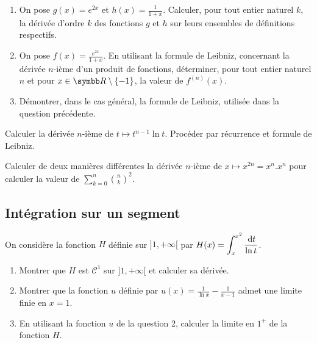 \begin{exercice}
\begin{enumerate}
    \item On pose $g(x)=e^{2x}$ et $h(x)=\frac{1}{1+x}$.
        Calculer, pour tout entier naturel $k$, la dérivée d'ordre $k$ des fonctions $g$ et $h$ sur leurs ensembles de définitions respectifs.
    \item On pose $f(x)=\frac{e^{2x}}{1+x}$.
        En utilisant la formule de Leibniz, concernant la dérivée $n$-ième d'un produit de fonctions, 
        déterminer, pour tout entier naturel $n$ et pour $x\in\R\setminus\{-1\}$, la valeur de $f^{(n)}(x)$.
    \item Démontrer, dans le cas général, la formule de Leibniz, utilisée dans la question précédente.
\end{enumerate}
\end{exercice}

\begin{exercice}
    Calculer la dérivée $n$-ième de $t \mapsto t^{n-1} \ln t$.
    Procéder par récurrence et formule de Leibniz.
\end{exercice}

\begin{exercice}
    Calculer de deux manières différentes la dérivée $n$-ième de $x\mapsto x^{2n}=x^{n}.x^{n}$ 
    pour calculer la valeur de $\displaystyle \sum_{k=0}^{n}\binom{n}{k}^{2}$.
\end{exercice}

\subsection{Intégration sur un segment}

\begin{exercice}
On considère la fonction $H$ définie sur $]1, +\infty[$ par $\displaystyle H(x)=\int_{x}^{x^{2}}\frac{\,\mathrm{d}t}{\ln t}$.
\begin{enumerate}
    \item Montrer que $H$ est $\mathcal{C}^{1}$ sur $]1,+\infty[$ et calculer sa dérivée.
    \item Montrer que la fonction $u$ définie par $u(x)=\frac{1}{\ln x}-\frac{1}{x-1}$ admet une limite finie en $x=1$.
    \item En utilisant la fonction $u$ de la question 2, calculer la limite en $1^+$ de la fonction $H$.
\end{enumerate}
\end{exercice}

